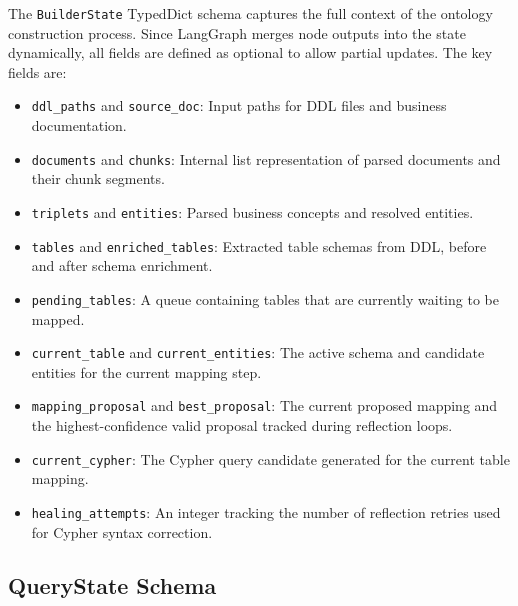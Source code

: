 The \texttt{BuilderState} TypedDict schema captures the full context of the ontology construction process. Since LangGraph merges node outputs into the state dynamically, all fields are defined as optional to allow partial updates. The key fields are:
\begin{itemize}
    \item \texttt{ddl\_paths} and \texttt{source\_doc}: Input paths for DDL files and business documentation.
    \item \texttt{documents} and \texttt{chunks}: Internal list representation of parsed documents and their chunk segments.
    \item \texttt{triplets} and \texttt{entities}: Parsed business concepts and resolved entities.
    \item \texttt{tables} and \texttt{enriched\_tables}: Extracted table schemas from DDL, before and after schema enrichment.
    \item \texttt{pending\_tables}: A queue containing tables that are currently waiting to be mapped.
    \item \texttt{current\_table} and \texttt{current\_entities}: The active schema and candidate entities for the current mapping step.
    \item \texttt{mapping\_proposal} and \texttt{best\_proposal}: The current proposed mapping and the highest-confidence valid proposal tracked during reflection loops.
    \item \texttt{current\_cypher}: The Cypher query candidate generated for the current table mapping.
    \item \texttt{healing\_attempts}: An integer tracking the number of reflection retries used for Cypher syntax correction.
\end{itemize}

\subsection{QueryState Schema}
\label{sec:imp:query_state}

